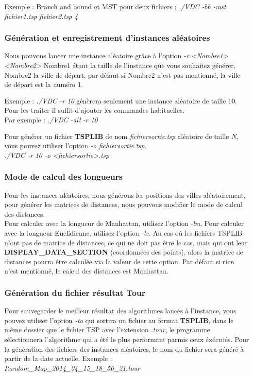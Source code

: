 \documentclass[12pt]{report}
\begin{document}
Exemple : Branch and bound et MST pour deux fichiers : \emph{./VDC -bb -mst fichier1.tsp fichier2.tsp 4}


\subsubsection{Génération et enregistrement d'instances aléatoires}

Nous pouvons lancer une instance aléatoire grâce à l'option \textit{-r <Nombre1> <Nombre2>} Nombre1 étant la taille de l'instance que vous souhaitez générer, Nombre2 la ville de départ, par défaut si Nombre2 n'est pas mentionné, la ville de départ est la numéro 1.

Exemple : \emph{./VDC -r 10} génèrera seulement une instance aléatoire de taille 10. \\
Pour les traiter il suffit d'ajouter les commandes habituelles.\\
Par exemple : \emph{./VDC -all -r 10}

Pour générer un fichier \textbf{TSPLIB} de nom \textit{fichiersortie.tsp} aléatoire de taille \textit{N}, vous pouvez utiliser l'option \textit{-o fichiersortie.tsp}.\\ \emph{./VDC -r 10 -o <fichiersortie>.tsp}

\subsubsection{Mode de calcul des longueurs}

Pour les instances aléatoires, nous générons les positions des villes aléatoirement, pour générer les matrices de distances, nous pouvons modifier le mode de calcul des distances.\\
Pour calculer avec la longueur de Manhattan, utilisez l'option \textit{-lm}.
Pour calculer avec la longueur Euclidienne, utilisez l'option \textit{-le}.
Au cas où les fichiers TSPLIB n'ont pas de matrice de distances, ce qui ne doit pas être le cas, mais qui ont leur \textbf{DISPLAY\_DATA\_SECTION} (coordonnées des points), alors la matrice de distances pourra être calculée via la valeur de cette option.
Par défaut si rien n'est mentionné, le calcul des distances est Manhattan.

\subsubsection{Génération du fichier résultat Tour}

Pour sauvegarder le meilleur résultat des algorithmes lancés à l'instance, vous pouvez utiliser l'option \textit{-to} qui sortira un fichier au format \textbf{TSPLIB}, dans le même dossier que le fichier TSP avec l'extension \textit{.tour}, le programme sélectionnera l'algorithme qui a été le plus performant parmis ceux éxécutés.
Pour la génération des fichiers des instances aléatoires, le nom du fichier sera généré à partir de la date actuelle.
Exemple : \emph{Random\_Map\_2014\_04\_15\_18\_50\_21.tour}
\end{document}

